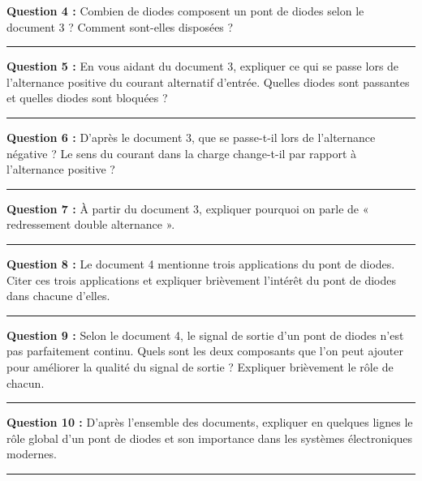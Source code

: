 \documentclass[11pt,a4paper]{article}
\begin{document}
\textbf{Question 4 :} Combien de diodes composent un pont de diodes selon le document 3 ? Comment sont-elles disposées ?

\vspace{2cm}
\hrule
\vspace{2cm}

\textbf{Question 5 :} En vous aidant du document 3, expliquer ce qui se passe lors de l'alternance positive du courant alternatif d'entrée. Quelles diodes sont passantes et quelles diodes sont bloquées ?

\vspace{3cm}
\hrule
\vspace{2cm}

\textbf{Question 6 :} D'après le document 3, que se passe-t-il lors de l'alternance négative ? Le sens du courant dans la charge change-t-il par rapport à l'alternance positive ?

\vspace{3cm}
\hrule
\vspace{2cm}

\textbf{Question 7 :} À partir du document 3, expliquer pourquoi on parle de « redressement double alternance ».

\vspace{2cm}
\hrule
\vspace{2cm}

\textbf{Question 8 :} Le document 4 mentionne trois applications du pont de diodes. Citer ces trois applications et expliquer brièvement l'intérêt du pont de diodes dans chacune d'elles.

\vspace{4cm}
\hrule
\vspace{2cm}

\textbf{Question 9 :} Selon le document 4, le signal de sortie d'un pont de diodes n'est pas parfaitement continu. Quels sont les deux composants que l'on peut ajouter pour améliorer la qualité du signal de sortie ? Expliquer brièvement le rôle de chacun.

\vspace{3cm}
\hrule
\vspace{2cm}

\textbf{Question 10 :} D'après l'ensemble des documents, expliquer en quelques lignes le rôle global d'un pont de diodes et son importance dans les systèmes électroniques modernes.

\vspace{3cm}
\hrule
\end{document}
